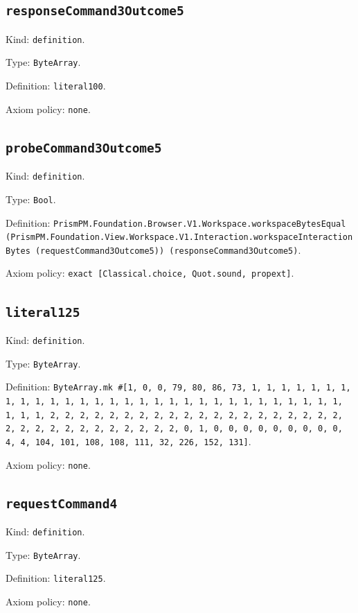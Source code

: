 \documentclass[11pt]{article}
\begin{document}
\subsection*{\texttt{responseCommand3Outcome5}}
\noindent Kind: \texttt{definition}.\par
\noindent Type: \texttt{ByteArray}.\par
\noindent Definition: \texttt{literal100}.\par
\noindent Axiom policy: \texttt{none}.\par
\subsection*{\texttt{probeCommand3Outcome5}}
\noindent Kind: \texttt{definition}.\par
\noindent Type: \texttt{Bool}.\par
\noindent Definition: \texttt{PrismPM.Foundation.Browser.V1.Workspace.workspaceBytesEqual (PrismPM.Foundation.View.Workspace.V1.Interaction.workspaceInteractionBytes (requestCommand3Outcome5)) (responseCommand3Outcome5)}.\par
\noindent Axiom policy: \texttt{exact [Classical.choice, Quot.sound, propext]}.\par
\subsection*{\texttt{literal125}}
\noindent Kind: \texttt{definition}.\par
\noindent Type: \texttt{ByteArray}.\par
\noindent Definition: \texttt{ByteArray.mk \#[1, 0, 0, 79, 80, 86, 73, 1, 1, 1, 1, 1, 1, 1, 1, 1, 1, 1, 1, 1, 1, 1, 1, 1, 1, 1, 1, 1, 1, 1, 1, 1, 1, 1, 1, 1, 1, 1, 1, 1, 2, 2, 2, 2, 2, 2, 2, 2, 2, 2, 2, 2, 2, 2, 2, 2, 2, 2, 2, 2, 2, 2, 2, 2, 2, 2, 2, 2, 2, 2, 2, 2, 0, 1, 0, 0, 0, 0, 0, 0, 0, 0, 0, 4, 4, 104, 101, 108, 108, 111, 32, 226, 152, 131]}.\par
\noindent Axiom policy: \texttt{none}.\par
\subsection*{\texttt{requestCommand4}}
\noindent Kind: \texttt{definition}.\par
\noindent Type: \texttt{ByteArray}.\par
\noindent Definition: \texttt{literal125}.\par
\noindent Axiom policy: \texttt{none}.\par
\end{document}
